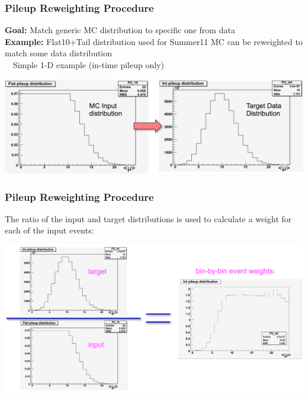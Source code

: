 \begin{frame}[t]\frametitle{Pileup Reweighting Procedure}
	\vspace*{-0.35cm}
    \begin{exampleblock}{}
    	\textbf{Goal:} Match generic MC distribution to specific one from data\\
    	\textbf{Example:} Flat10+Tail distribution used for Summer11 MC can be reweighted to match some data distribution\\~~Simple 1-D example (in-time pileup only)
    \end{exampleblock}
    \vspace*{0.5cm}
    \includegraphics[width=\textwidth]{images/pileup_reweighting/pr_2.png}
\end{frame}

\begin{frame}[t]\frametitle{Pileup Reweighting Procedure}
	\vspace*{-0.35cm}
	\begin{exampleblock}{}
		The ratio of the input and target distributions is used to calculate a weight for each of the input events:
	\end{exampleblock}
	\vspace*{0.25cm}
	\includegraphics[width=\textwidth]{images/pileup_reweighting/pr_3.png}
\end{frame}

